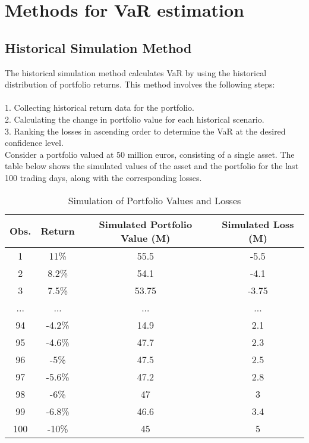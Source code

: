 \documentclass[a4paper,10pt]{article}
\begin{document}
\section{Methods for VaR estimation}

\subsection{Historical Simulation Method}

\noindent The historical simulation method calculates VaR by using the historical distribution of portfolio returns. This method involves the following steps:\\\\
1. Collecting historical return data for the portfolio.\\
2. Calculating the change in portfolio value for each historical scenario.\\
3. Ranking the losses in ascending order to determine the VaR at the desired confidence level.\\

\noindent Consider a portfolio valued at 50 million euros, consisting of a single asset. The table below shows the simulated values of the asset and the portfolio for the last 100 trading days, along with the corresponding losses.\\

\begin{table}[htbp]
\centering 
\begin{tabular}{|c|c|c|c|} 
\hline
Obs. & Return & Simulated Portfolio Value (M) & Simulated Loss (M) \\
\hline
1 & 11\% & 55.5 & -5.5 \\
2 & 8.2\% & 54.1 & -4.1  \\
3 & 7.5\% & 53.75 & -3.75  \\
... & ... & ... & ...  \\
94 & -4.2\% & 14.9 & 2.1  \\
95 & -4.6\% & 47.7 & {2.3} \\
96 & -5\% & 47.5 & 2.5  \\
97 & -5.6\% & 47.2 & 2.8  \\
98 & -6\% & 47 & 3  \\
99 & -6.8\% & 46.6 & 3.4  \\
100 & -10\% & 45 & 5  \\
\hline
\end{tabular}
\caption{Simulation of Portfolio Values and Losses} 
\label{tab:portfolio-simulation} 
\end{table}\\
\end{document}
